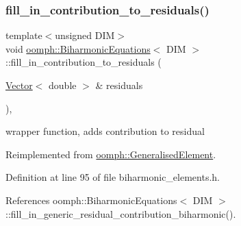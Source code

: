 \subsubsection{\texorpdfstring{fill\+\_\+in\+\_\+contribution\+\_\+to\+\_\+residuals()}{fill\_in\_contribution\_to\_residuals()}}
{\footnotesize\ttfamily template$<$unsigned D\+IM$>$ \\
void \hyperlink{classoomph_1_1BiharmonicEquations}{oomph\+::\+Biharmonic\+Equations}$<$ D\+IM $>$\+::fill\+\_\+in\+\_\+contribution\+\_\+to\+\_\+residuals (\begin{DoxyParamCaption}\item[{\hyperlink{classoomph_1_1Vector}{Vector}$<$ double $>$ \&}]{residuals }\end{DoxyParamCaption})\hspace{0.3cm}{\ttfamily [inline]}, {\ttfamily [virtual]}}



wrapper function, adds contribution to residual 



Reimplemented from \hyperlink{classoomph_1_1GeneralisedElement_a310c97f515e8504a48179c0e72c550d7}{oomph\+::\+Generalised\+Element}.



Definition at line 95 of file biharmonic\+\_\+elements.\+h.



References oomph\+::\+Biharmonic\+Equations$<$ D\+I\+M $>$\+::fill\+\_\+in\+\_\+generic\+\_\+residual\+\_\+contribution\+\_\+biharmonic().

\mbox{\label{classoomph_1_1BiharmonicEquations_a63bf0dbf59b9355563e71cf0b9eff2ee}} 
